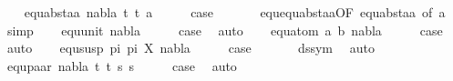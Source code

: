 \begin{isabellebody}
\isanewline
\ \ \isamarkupfalse%
\ {\isacharparenleft}{\kern0pt}equ{\isacharunderscore}{\kern0pt}abst{\isacharunderscore}{\kern0pt}aa\ nabla\ t{}{\isacharprime}{\kern0pt}\ t{}{\isacharprime}{\kern0pt}\ a{\isacharparenright}{\kern0pt}\isanewline
\ \ \isamarkupfalse%
\ \isamarkupfalse%
\ {\isacharquery}{\kern0pt}case\ \isanewline
\ \ \ \ \isamarkupfalse%
\ equ{\isachardot}{\kern0pt}equ{\isacharunderscore}{\kern0pt}abst{\isacharunderscore}{\kern0pt}aa{\isacharbrackleft}{\kern0pt}OF\ equ{\isacharunderscore}{\kern0pt}abst{\isacharunderscore}{\kern0pt}aa{\isacharparenleft}{\kern0pt}{}{\isacharparenright}{\kern0pt}{\isacharcomma}{\kern0pt}\ of\ a{\isacharbrackright}{\kern0pt}\ \isamarkupfalse%
\ simp\isanewline
{}\isamarkupfalse%
\isanewline
\ \ \isamarkupfalse%
\ {\isacharparenleft}{\kern0pt}equ{\isacharunderscore}{\kern0pt}unit\ nabla{\isacharparenright}{\kern0pt}\isanewline
\ \ \isamarkupfalse%
\ \isamarkupfalse%
\ {\isacharquery}{\kern0pt}case\ \isamarkupfalse%
\ auto\isanewline
{}\isamarkupfalse%
\isanewline
\ \ \isamarkupfalse%
\ {\isacharparenleft}{\kern0pt}equ{\isacharunderscore}{\kern0pt}atom\ a\ b\ nabla{\isacharparenright}{\kern0pt}\isanewline
\ \ \isamarkupfalse%
\ \isamarkupfalse%
\ {\isacharquery}{\kern0pt}case\ \isamarkupfalse%
\ auto\isanewline
{}\isamarkupfalse%
\isanewline
\ \ \isamarkupfalse%
\ {\isacharparenleft}{\kern0pt}equ{\isacharunderscore}{\kern0pt}susp\ pi{}\ pi{}\ X\ nabla{\isacharparenright}{\kern0pt}\isanewline
\ \ \isamarkupfalse%
\ \isamarkupfalse%
\ {\isacharquery}{\kern0pt}case\ \isanewline
\ \ \ \ \isamarkupfalse%
\ ds{\isacharunderscore}{\kern0pt}sym\ \isamarkupfalse%
\ auto\isanewline
{}\isamarkupfalse%
\isanewline
\ \ \isamarkupfalse%
\ {\isacharparenleft}{\kern0pt}equ{\isacharunderscore}{\kern0pt}paar\ nabla\ t{}{\isacharprime}{\kern0pt}\ t{}{\isacharprime}{\kern0pt}\ s{}{\isacharprime}{\kern0pt}\ s{}{\isacharprime}{\kern0pt}{\isacharparenright}{\kern0pt}\isanewline
\ \ \isamarkupfalse%
\ \isamarkupfalse%
\ {\isacharquery}{\kern0pt}case\ \isamarkupfalse%
\ auto\isanewline
{}\isamarkupfalse%

\end{isabellebody}
